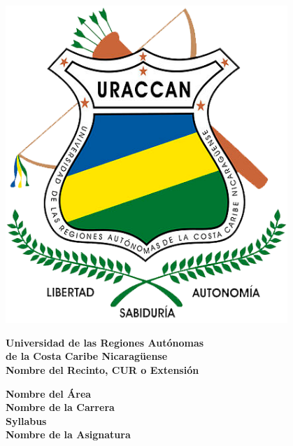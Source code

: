 \begin{titlepage}
    \noindent
    \begin{minipage}{0.2\textwidth}
        \begin{center}
            \includegraphics[width=0.8\textwidth]{images/uraccan_logo.png}
        \end{center}
    \end{minipage}%
    \begin{minipage}{0.8\textwidth}
        \begin{center}
            \Large{\textbf{Universidad de las Regiones Autónomas\\de la Costa Caribe Nicaragüense}}\\
            \vspace{0.2cm}
            \Large{\textbf{Nombre del Recinto, CUR o Extensión}}\\
        \end{center}
    \end{minipage}

    \begin{center}
        \vspace{2cm}
        \large{\textbf{Nombre del Área}}\\
        \large{\textbf{Nombre de la Carrera}}\\

        \vspace{3cm}
        \large{\textbf{Syllabus}}\\
        \Huge{\textbf{Nombre de la Asignatura}}\\


\end{center}
\end{titlepage}
